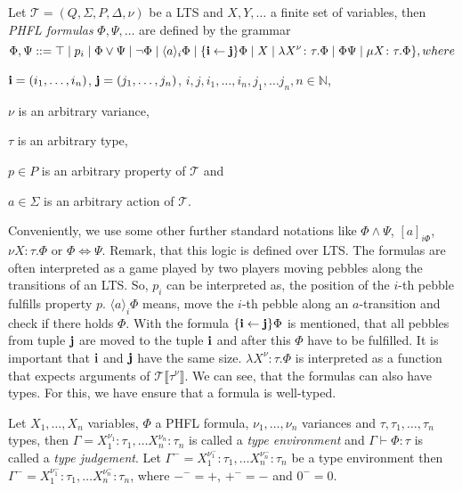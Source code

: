 \begin{definition}
    Let $\mathcal{T} = (Q, \Sigma, P, \Delta, \nu)$ be a LTS and $X, Y, \dots$ a finite set of variables, then
    \emph{PHFL formulas} $\Phi, \Psi,\dots$ are defined by the grammar
    \[\Phi,\Psi::=\top \mid p_i \mid \Phi \vee \Psi \mid \neg \Phi \mid \langle a \rangle_i \Phi \mid \{\emph{i}
    \leftarrow \emph{j}\} \Phi \mid X \mid \lambda X^\nu\colon\tau.\Phi \mid \Phi \Psi \mid \mu X\colon\tau.\Phi\},
    where\]
    \begin{compactitem}
        \item $\emph{i} = (i_1,\dots, i_n)$, $\emph{j} = (j_1,\dots,j_n)$, $i, j, i_1,\dots,i_n, j_1, \dots j_n, n\in
        \mathbb{N}$,
        \item $\nu$ is an arbitrary variance,
        \item $\tau$ is an arbitrary type,
        \item $p \in P$ is an arbitrary property of $\mathcal{T}$ and
        \item $a \in \Sigma$ is an arbitrary action of $\mathcal{T}$.
    \end{compactitem}
\end{definition}

Conveniently, we use some other further standard notations like $\Phi \wedge \Psi$, $[a]_{i\Phi}$, $\nu
X \colon \tau . \Phi$ or $\Phi \Leftrightarrow \Psi$. Remark, that this logic is defined over LTS. The formulas are
often interpreted as a game played by two players  moving pebbles along the transitions of an LTS. So, $p_i$ can be
interpreted as, the position of the $i$-th pebble fulfills property $p$. $\langle a \rangle_i \Phi$ means, move the
$i$-th pebble along an $a$-transition and check if there holds $\Phi$. With the formula $\{\emph{i}\leftarrow
\emph{j}\} \Phi$ is mentioned, that all pebbles from tuple $\emph{j}$ are moved to the tuple $\emph{i}$ and after
this $\Phi$ have to be fulfilled. It is important that $\emph{i}$ and $\emph{j}$ have the same size. $\lambda
X^\nu\colon\tau.\Phi$ is interpreted as a function that expects arguments of
$\mathcal{T}\llbracket\tau^\nu\rrbracket$. We can see, that the formulas can also have types. For this, we have
ensure that a formula is well-typed.

\begin{definition}
    Let $X_1, \dots, X_n$ variables, $\Phi$ a PHFL formula, $\nu_1, \dots, \nu_n$ variances and $\tau, \tau_1, \dots,
    \tau_n$ types, then $\Gamma = X_1^{\nu_1}\colon \tau_1, \dots X_n^{\nu_n} \colon \tau_n$ is
    called a \emph{type environment} and $\Gamma \vdash \Phi:\tau$
    is called a \emph{type judgement}. Let $\Gamma^- = X_1^{\nu_1^-}\colon \tau_1, \dots
    X_n^{\nu_n^-} \colon \tau_n$ be a type environment then $\Gamma^- = X_1^{\nu_1^-}\colon \tau_1, \dots
    X_n^{\nu_n^-} \colon \tau_n$, where $-^- = +$, $+^- = -$ and $0^- = 0$.
\end{definition}

